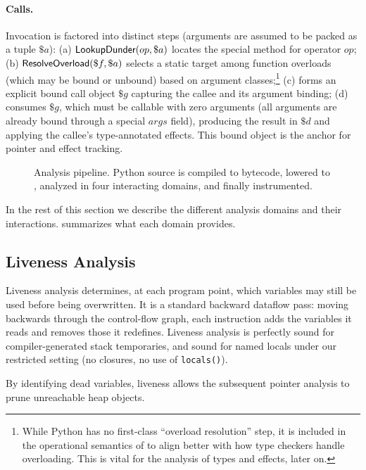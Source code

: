 \paragraph{Calls.}
Invocation is factored into distinct steps (arguments are assumed to be packed as a tuple
$\$a$): (a) $\textsf{LookupDunder}(op,\$a)$ locates the special method
for operator $op$; (b) $\textsf{ResolveOverload}(\$f,\$a)$ selects a static target among function overloads (which may be bound or unbound) based on argument classes;\footnote{While Python has no first-class ``overload resolution'' step, it is included in the operational semantics of \spytecode to align better with how type checkers handle overloading. This is vital for the analysis of types and effects, later on.}
(c) \tBind forms an explicit bound call object $\$g$ capturing the callee and its
argument binding; (d) \tCall consumes $\$g$, which must be callable with zero arguments (all arguments are already bound through a special $args$ field), producing the result in $\$d$ and applying the callee's type-annotated effects. This bound object is the anchor for
pointer and effect tracking.

\begin{figure}[t]
    \centering
    \small
    
    \caption{Analysis pipeline. Python source is compiled to bytecode, lowered to \spytecode, analyzed in four interacting domains, and finally instrumented.}
    \label{fig:overview}
\end{figure}

In the rest of this section we describe the different analysis domains and their interactions.  summarizes what each domain provides.

\subsection{Liveness Analysis}
\label{sec:liveness}

Liveness analysis determines, at each program point, which \spytecode variables may still be used before being overwritten.  
It is a standard backward dataflow pass: moving backwards through the control-flow graph, each instruction adds the variables it reads and removes those it redefines.  Liveness analysis is perfectly sound for compiler-generated stack temporaries, and sound for named locals under our restricted setting (no closures, no use of \texttt{locals()}).

By identifying dead variables, liveness allows the subsequent pointer analysis to prune unreachable heap objects.

